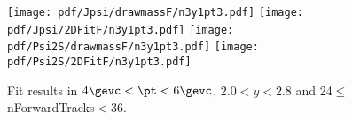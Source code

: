 \begin{figure}[H]
\begin{center}
\texttt{[image: pdf/Jpsi/drawmassF/n3y1pt3.pdf]}
\texttt{[image: pdf/Jpsi/2DFitF/n3y1pt3.pdf]}
\vspace*{-0.5cm}
\texttt{[image: pdf/Psi2S/drawmassF/n3y1pt3.pdf]}
\texttt{[image: pdf/Psi2S/2DFitF/n3y1pt3.pdf]}
\vspace*{-0.5cm}
\end{center}
\caption{Fit results in $4\gevc<\pt<6\gevc$, $2.0<y<2.8$ and 24$\leq$nForwardTracks$<$36.}
\label{Fitn3y1pt3}
\end{figure}
